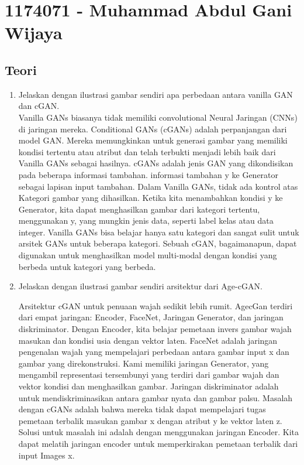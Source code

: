 \section{1174071 - Muhammad Abdul Gani Wijaya}

\subsection{Teori}
\begin{enumerate}
	\item Jelaskan dengan ilustrasi gambar sendiri apa perbedaan antara vanilla GAN dan cGAN.\\
	Vanilla GANs biasanya tidak memiliki convolutional Neural Jaringan (CNNs) di jaringan mereka.
Conditional GANs (cGANs) adalah perpanjangan dari model GAN. Mereka memungkinkan untuk generasi gambar yang memiliki kondisi tertentu atau atribut dan telah terbukti menjadi lebih baik dari Vanilla GANs sebagai hasilnya. 
cGANs adalah jenis GAN yang dikondisikan pada beberapa informasi tambahan.  informasi tambahan y ke Generator sebagai lapisan input tambahan. Dalam Vanilla GANs, tidak ada kontrol atas Kategori gambar yang dihasilkan. Ketika kita menambahkan kondisi y ke Generator, kita dapat menghasilkan gambar dari kategori tertentu, menggunakan y, yang mungkin jenis data, seperti label kelas atau data integer. Vanilla GANs bisa belajar hanya satu kategori dan sangat sulit untuk arsitek GANs untuk beberapa kategori. Sebuah cGAN, bagaimanapun, dapat digunakan untuk menghasilkan model multi-modal dengan kondisi yang berbeda untuk kategori yang berbeda.

	
	\item Jelaskan dengan ilustrasi gambar sendiri arsitektur dari Age-cGAN.
	\hfill \break
	
	Arsitektur cGAN untuk penuaan wajah sedikit lebih rumit. AgecGan terdiri dari empat jaringan: Encoder, FaceNet, Jaringan Generator, dan jaringan diskriminator. Dengan Encoder, kita belajar pemetaan invers gambar wajah masukan dan kondisi usia dengan vektor laten. FaceNet adalah jaringan pengenalan wajah yang mempelajari perbedaan antara gambar input x dan gambar yang direkonstruksi. Kami memiliki jaringan Generator, yang mengambil representasi tersembunyi yang terdiri dari gambar wajah dan vektor kondisi dan menghasilkan gambar. Jaringan diskriminator adalah untuk mendiskriminasikan antara gambar nyata dan gambar palsu. Masalah dengan cGANs adalah bahwa mereka tidak dapat mempelajari tugas pemetaan terbalik masukan gambar x dengan atribut y ke vektor laten z. Solusi untuk masalah ini adalah dengan menggunakan jaringan Encoder. Kita dapat melatih jaringan encoder untuk memperkirakan pemetaan terbalik dari input Images x.
	

\end{enumerate}
